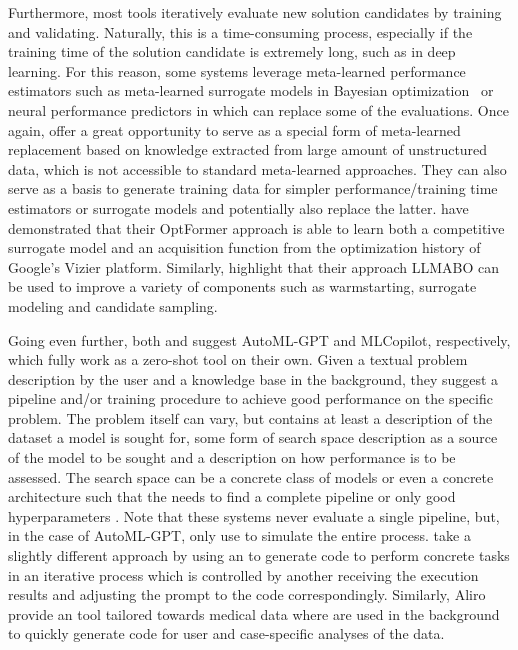 \documentclass[10pt]{article} %
\begin{document}
Furthermore, most \AutoML tools iteratively evaluate new solution candidates by training and validating. Naturally, this is a time-consuming process, especially if the training time of the solution candidate is extremely long, such as in deep learning. For this reason, some systems leverage meta-learned performance estimators such as meta-learned surrogate models in Bayesian optimization~\citep{vanschoren-automlbook19a} or neural performance predictors in \NAS \citep{white-neurips21a} which can replace some of the evaluations. Once again, \LLMs offer a great opportunity to serve as a special form of meta-learned replacement based on knowledge extracted from large amount of unstructured data, which is not accessible to standard meta-learned approaches. They can also serve as a basis to generate training data for simpler performance/training time estimators or surrogate models and potentially also replace the latter. \citet{chen-neurips22a} have demonstrated that their OptFormer approach is able to learn both a competitive surrogate model and an acquisition function from the optimization history of Google's Vizier \citep{song-icml22b} platform. Similarly, \citet{liu-iclr24a} highlight that their approach LLMABO can be used to improve a variety of \AutoML components such as warmstarting, surrogate modeling and candidate sampling.

Going even further, both \citet{zhang-arxiv23b} and \citet{zhang-arxiv23a} suggest AutoML-GPT and MLCopilot, respectively, which fully work as a zero-shot \AutoML tool on their own. Given a textual problem description by the user and a knowledge base in the background, they suggest a pipeline and/or training procedure to achieve good performance on the specific problem. The problem itself can vary, but contains at least a description of the dataset a model is sought for, some form of search space description as a source of the model to be sought and a description on how performance is to be assessed. The search space can be a concrete class of models or even a concrete architecture such that the \LLM needs to find a complete pipeline or only good hyperparameters \citep{zhang-arxiv23b}. Note that these systems never evaluate a single \ML pipeline, but, in the case of AutoML-GPT, only use \LLMs to simulate the entire \AutoML process. \citet{tsai-arxiv23a} take a slightly different approach by using an \LLM to generate code to perform concrete \AutoML tasks in an iterative process which is controlled by another \LLM receiving the execution results and adjusting the prompt to the code \LLM correspondingly. Similarly, Aliro \citep{choi-bioinformatics23a} provide an \AutoML tool tailored towards medical data where \LLMs are used in the background to quickly generate code for user and case-specific analyses of the data.
\end{document}
